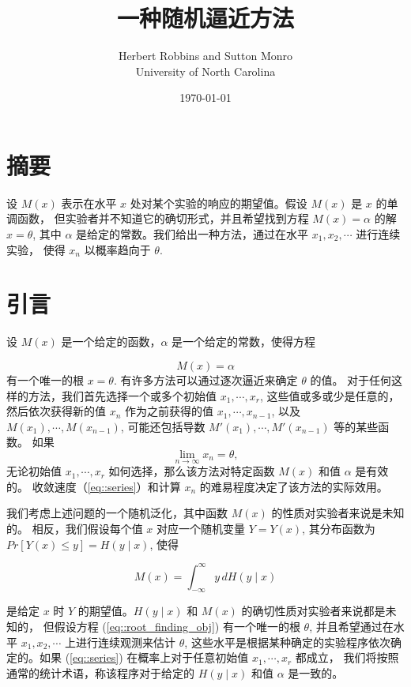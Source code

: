 \documentclass{article}
\title{一种随机逼近方法\cite{robbins1951stochastic}}
\author{Herbert Robbins and Sutton Monro \\
University of North Carolina}
\date{\today}
\begin{document}
  
\maketitle  

\section{摘要}
设 $ M(x) $ 表示在水平 $ x $ 处对某个实验的响应的期望值。假设 $ M(x) $ 是 $ x $ 的单调函数，
但实验者并不知道它的确切形式，并且希望找到方程 $ M(x) = \alpha $ 的解 $ x = \theta $, 
其中 $ \alpha $ 是给定的常数。我们给出一种方法，通过在水平 $ x_1, x_2, \cdots $ 进行连续实验，
使得 $ x_n $ 以概率趋向于 $ \theta $. 

\section{引言}
\label{sec::introduction}
设 $ M(x) $ 是一个给定的函数，$ \alpha $ 是一个给定的常数，使得方程

\begin{equation}
\label{eq::root_finding_obj}
M(x) = \alpha 
\end{equation}
有一个唯一的根 $ x = \theta $. 有许多方法可以通过逐次逼近来确定 $ \theta $ 的值。
对于任何这样的方法，我们首先选择一个或多个初始值 $ x_1, \cdots, x_r $, 
这些值或多或少是任意的，然后依次获得新的值 $ x_n $ 作为之前获得的值 $ x_1, \cdots, x_{n-1} $, 
以及 $ M(x_1), \cdots, M(x_{n-1}) $, 可能还包括导数 $ M'(x_1), \cdots, M'(x_{n-1}) $ 等的某些函数。
如果
\begin{equation}
    \label{eq::series}
\lim_{n \to \infty} x_n = \theta, 
\end{equation}
无论初始值 $ x_1, \cdots, x_r $ 如何选择，那么该方法对特定函数 $ M(x) $ 和值 $ \alpha $ 是有效的。
收敛速度（\ref{eq::series}）和计算 $ x_n $ 的难易程度决定了该方法的实际效用。

我们考虑上述问题的一个随机泛化，其中函数 $M(x)$ 的性质对实验者来说是未知的。
相反，我们假设每个值 $x$ 对应一个随机变量 $Y = Y(x)$, 其分布函数为 $Pr[Y(x) \leq y] = H(y \mid x)$, 使得

\begin{equation}
    \label{eq::expectation}
    M(x) = \int_{-\infty}^{\infty} y \, dH(y \mid x)
\end{equation}

是给定 $x$ 时 $Y$ 的期望值。$H(y \mid x)$ 和 $M(x)$ 的确切性质对实验者来说都是未知的，
但假设方程 (\ref{eq::root_finding_obj}) 有一个唯一的根 $\theta$, 
并且希望通过在水平 $x_1, x_2, \cdots$ 上进行连续观测来估计 $\theta$, 
这些水平是根据某种确定的实验程序依次确定的。如果 (\ref{eq::series}) 在概率上对于任意初始值 $x_1, \cdots, x_r$ 都成立，
我们将按照通常的统计术语，称该程序对于给定的 $H(y \mid x)$ 和值 $\alpha$ 是一致的。
\end{document}
